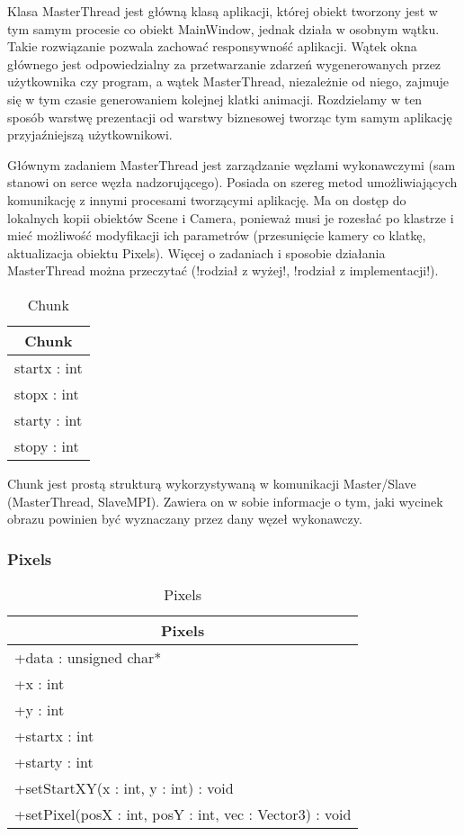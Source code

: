 Klasa MasterThread jest główną klasą aplikacji, której obiekt tworzony jest w tym samym procesie co obiekt MainWindow, jednak działa w osobnym wątku. Takie rozwiązanie pozwala zachować responsywność aplikacji. Wątek okna głównego jest odpowiedzialny za przetwarzanie zdarzeń wygenerowanych przez użytkownika czy program, a wątek MasterThread, niezależnie od niego, zajmuje się w tym czasie generowaniem kolejnej klatki animacji. Rozdzielamy w ten sposób warstwę prezentacji od warstwy biznesowej tworząc tym samym aplikację przyjaźniejszą użytkownikowi.

Głównym zadaniem MasterThread jest zarządzanie węzłami wykonawczymi (sam stanowi on serce węzła nadzorującego). Posiada on szereg metod umożliwiających komunikację z innymi procesami tworzącymi aplikację. Ma on dostęp do lokalnych kopii obiektów Scene i Camera, ponieważ musi je rozesłać po klastrze i mieć możliwość modyfikacji ich parametrów (przesunięcie kamery co klatkę, aktualizacja obiektu Pixels). Więcej o zadaniach i sposobie działania MasterThread można przeczytać (!rodział z wyżej!, !rodział z implementacji!).

\footnotesize
\begin{longtable}{|p{14cm}|}
    \caption{Chunk} \label{tab:Chunk (struktura} \\ \hline
    \multicolumn{1}{|c|}{Chunk} \\ \hline
    startx : int \\
    stopx : int \\
    starty : int \\
    stopy : int \\
    \hline
\end{longtable}
\normalsize

Chunk jest prostą strukturą wykorzystywaną w komunikacji Master/Slave (MasterThread, SlaveMPI). Zawiera on w sobie informacje o tym, jaki wycinek obrazu powinien być wyznaczany przez dany węzeł wykonawczy.

\subsubsection{Pixels}

\footnotesize
\begin{longtable}{|p{14cm}|}
    \caption{Pixels} \label{tab:Pixels} \\ \hline
    \multicolumn{1}{|c|}{Pixels} \\ \hline
    +data : unsigned char* \\
    +x : int \\
    +y : int \\ 
    +startx : int \\
    +starty : int \\
    \hline
	+setStartXY(x : int, y : int) : void \\
	+setPixel(posX : int, posY : int, vec : Vector3) : void \\
	\hline
\end{longtable}
\normalsize

